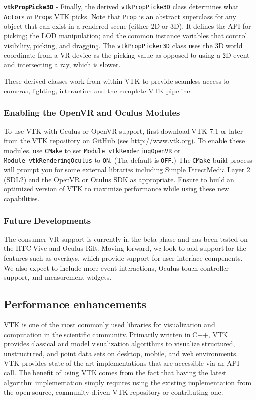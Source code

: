 \textbf{\texttt{vtkPropPicke3D}} - Finally, the derived \texttt{vtkPropPicke3D} class determines what \texttt{Actor}s or \texttt{Prop}s VTK picks.
Note that \texttt{Prop} is an abstract superclass for any object that can exist in a rendered scene (either 2D or 3D). It defines the API for picking; the LOD manipulation; and the common instance variables that control visibility, picking, and dragging.
The \texttt{vtkPropPicker3D} class uses the 3D world coordinate from a VR device as the picking value as opposed to using a 2D event and intersecting a ray, which is slower.

These derived classes work from within VTK to provide seamless access to cameras, lighting, interaction and the complete VTK pipeline.

\subsubsection{Enabling the OpenVR and Oculus Modules}

To use VTK with Oculus or OpenVR support, first download VTK 7.1 or later from the VTK
repository on GitHub (see \url{http://www.vtk.org}).
To enable these modules, use \texttt{CMake} to set \texttt{Module\_vtkRenderingOpenVR} or \texttt{Module\_vtkRenderingOculus} to \texttt{ON}. (The default is \texttt{OFF}.)
The \texttt{CMake} build process will prompt you for some external libraries including Simple DirectMedia Layer 2 (SDL2) and the OpenVR or Oculus SDK as appropriate.
Ensure to build an optimized version of VTK to maximize performance while using these new capabilities.

\subsubsection{Future Developments}

The consumer VR support is currently in the beta phase and has been tested on the HTC Vive and Oculus Rift. Moving forward, we look to add support for the features such as overlays, which provide support for user interface components. We also expect to include more event interactions, Oculus touch controller support, and measurement widgets.

\subsection{Performance enhancements}

VTK is one of the most commonly used libraries for visualization and computation in the scientific community.
Primarily written in C++, VTK provides classical and model visualization algorithms to visualize structured, unstructured, and point data sets on desktop, mobile, and web environments.
VTK provides state-of-the-art implementations that are accessible via an API call.
The benefit of using VTK comes from the fact that having the latest algorithm implementation simply requires using the existing implementation from the
open-source, community-driven VTK repository or contributing one.

